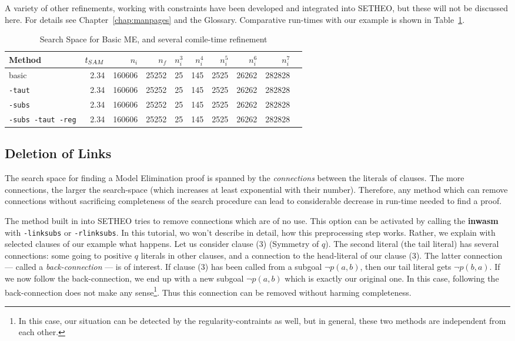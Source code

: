 A variety of other refinements, working with constraints have been
developed and integrated into SETHEO, but these will not be discussed
here. For details see Chapter~\ref{chap:manpages} and the Glossary.
Comparative run-times with our example is shown in 
Table~\ref{tab:tut2:results.constr}.

\begin{table}[htb]
\begin{center}
\begin{tabular}{|l|r|r||r|r||r|r|r|r|r|}
\hline
Method & $t_{SAM}$ & $n_i$ & $n_f$ & 
	$n_i^3$ & $n_i^4$ & $n_i^5$ & $n_i^6$ & $n_i^7$ \\
\hline\hline
basic & 2.34 & 160606 & 25252 &
	25 & 145 & 2525 & 26262 & 282828 \\
\hline
{\tt -taut} & 2.34 & 160606 & 25252 &
	25 & 145 & 2525 & 26262 & 282828 \\
\hline
{\tt -subs} & 2.34 & 160606 & 25252 &
	25 & 145 & 2525 & 26262 & 282828 \\
\hline
{\tt -subs -taut -reg} & 2.34 & 160606 & 25252 &
	25 & 145 & 2525 & 26262 & 282828 \\
\hline\hline
\end{tabular}
\end{center}
\caption{Search Space for Basic ME, and several comile-time
refinement}
\label{tab:tut2:results.constr}
\end{table}

\subsection{Deletion of Links}

The search space for finding a Model Elimination proof is spanned
by the {\em connections\/} between the literals of clauses. The more
connections, the larger the search-space (which increases at least
exponential with their number). Therefore, any method which can
remove connections without sacrificing completeness of the search procedure
can lead to considerable decrease in run-time needed to find a proof.

The method built in into SETHEO tries to remove connections which
are of no use. This option can be activated by calling the {\bf inwasm}
with {\tt -linksubs} or {\tt -rlinksubs}.
In this tutorial, wo won't describe in detail, how this preprocessing
step works. Rather, we explain with selected clauses of our example
what happens.
Let us consider clause (3) (Symmetry of $q$). The second literal
(the tail literal) has several connections: some going to positive
$q$ literals in other clauses, and a connection to the head-literal
of our clause (3). The latter connection --- called a {\em back-connection\/} ---
is of interest. If clause (3) has been called from a subgoal
$\neg p(a,b)$, then our tail literal gets $\neg p(b,a)$. If we now follow
the back-connection, we end up with a new subgoal $\neg p(a,b)$ which
is exactly our original one. In this case, following the back-connection
does not make any sense\footnote{
	In this case, our situation can be detected by the
	regularity-contraints as well, but in general, these
	two methods are independent from each other.
	}.
Thus this connection can be removed without
harming completeness.

